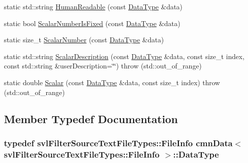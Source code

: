 \begin{DoxyCompactItemize}
\item 
static std\-::string \hyperlink{classcmn_data_3_01svl_filter_source_text_file_types_1_1_file_info_01_4_a1c327ba960996fd849acf5d594f39e38}{Human\-Readable} (const \hyperlink{classcmn_data_3_01svl_filter_source_text_file_types_1_1_file_info_01_4_a80103f0f921c89187ac2cadd6fd22d7b}{Data\-Type} \&data)
\item 
static bool \hyperlink{classcmn_data_3_01svl_filter_source_text_file_types_1_1_file_info_01_4_a79d95979b962c6e6cabf1c0325a08a51}{Scalar\-Number\-Is\-Fixed} (const \hyperlink{classcmn_data_3_01svl_filter_source_text_file_types_1_1_file_info_01_4_a80103f0f921c89187ac2cadd6fd22d7b}{Data\-Type} \&data)
\item 
static size\-\_\-t \hyperlink{classcmn_data_3_01svl_filter_source_text_file_types_1_1_file_info_01_4_a8e8b8bbeea5615638960f75c17247ce5}{Scalar\-Number} (const \hyperlink{classcmn_data_3_01svl_filter_source_text_file_types_1_1_file_info_01_4_a80103f0f921c89187ac2cadd6fd22d7b}{Data\-Type} \&data)
\item 
static std\-::string \hyperlink{classcmn_data_3_01svl_filter_source_text_file_types_1_1_file_info_01_4_aa56da1ae6f24f334d85f583aed7370ca}{Scalar\-Description} (const \hyperlink{classcmn_data_3_01svl_filter_source_text_file_types_1_1_file_info_01_4_a80103f0f921c89187ac2cadd6fd22d7b}{Data\-Type} \&data, const size\-\_\-t index, const std\-::string \&user\-Description=\char`\"{}\char`\"{})  throw (std\-::out\-\_\-of\-\_\-range)
\item 
static double \hyperlink{classcmn_data_3_01svl_filter_source_text_file_types_1_1_file_info_01_4_a16a070faf1bd3d50b6cb8b7459ab2304}{Scalar} (const \hyperlink{classcmn_data_3_01svl_filter_source_text_file_types_1_1_file_info_01_4_a80103f0f921c89187ac2cadd6fd22d7b}{Data\-Type} \&data, const size\-\_\-t index)  throw (std\-::out\-\_\-of\-\_\-range)
\end{DoxyCompactItemize}


\subsection{Member Typedef Documentation}
\hypertarget{classcmn_data_3_01svl_filter_source_text_file_types_1_1_file_info_01_4_a80103f0f921c89187ac2cadd6fd22d7b}{
\subsubsection[{Data\-Type}]{\setlength{\rightskip}{0pt plus 5cm}typedef {\bf svl\-Filter\-Source\-Text\-File\-Types\-::\-File\-Info} {\bf cmn\-Data}$<$ {\bf svl\-Filter\-Source\-Text\-File\-Types\-::\-File\-Info} $>$\-::{\bf Data\-Type}}}\label{classcmn_data_3_01svl_filter_source_text_file_types_1_1_file_info_01_4_a80103f0f921c89187ac2cadd6fd22d7b}


